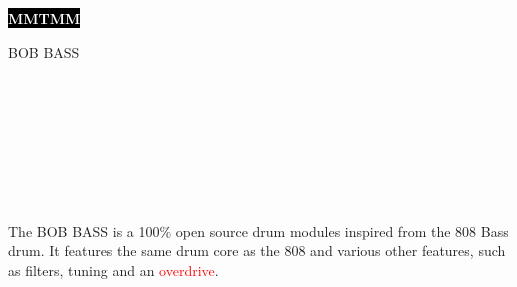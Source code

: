\documentclass[9pt]{developercv} %
\begin{document}
\begin{minipage}[t]{0.45\textwidth} %
	\vspace{-\baselineskip} %
	
	\colorbox{black}{{\HUGE\textcolor{white}{\textbf{\MakeUppercase{MMTMM}}}}} %
	
	\vspace{6pt}
	
	{\huge BOB BASS} %
\end{minipage}
\begin{minipage}[t]{0.275\textwidth} %
	\vspace{-\baselineskip} %
	
	\\
	\\
	\\	
\end{minipage}
\begin{minipage}[t]{0.275\textwidth} %
	\vspace{-\baselineskip} %
	
	\\
	\\
	\\
\end{minipage}

\vspace{0.5cm}


\begin{minipage}[t]{0.4\textwidth} %
	\vspace{-\baselineskip} %
	
The BOB BASS is a 100\% open source drum modules inspired from the 808 Bass drum. It features the same drum core as the 808 and various other features, such as filters, tuning and an \textcolor{red}{overdrive}.

\end{minipage}
\end{document}

